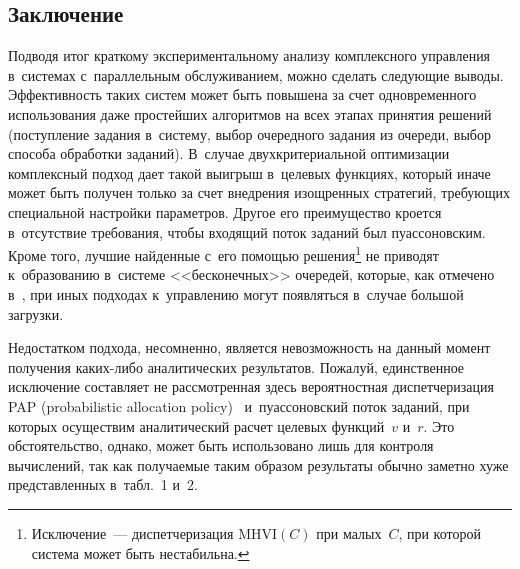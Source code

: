 \begin{multicols}{2}
\vspace*{-6pt}
   
\section{Заключение}

\vspace*{-6pt}

   Подводя итог краткому экспериментальному анализу комплексного 
управления в~системах с~параллельным обслуживанием, можно сделать 
следующие выводы. Эффективность таких систем может быть повышена за 
счет одновременного использования даже простейших алгоритмов на всех 
этапах принятия решений (поступление задания в~систему, выбор очередного 
задания из очереди, выбор способа обработки заданий). В~случае 
двухкритериальной оптимизации комплексный подход дает такой выигрыш 
в~целевых функциях, который иначе может быть получен только за счет 
внедрения изощренных стратегий, требующих специальной настройки 
параметров. Другое его преимущество кроется в~отсутствие требования, чтобы 
входящий поток заданий был пуассоновским. Кроме того, лучшие найденные 
с~его помощью решения\footnote[1]{Исключение~--- диспетчеризация $\mathrm{MHVI}(C)$ при 
малых~$C$, при которой система может быть нестабильна.} не приводят к~образованию 
в~системе <<бесконечных>> очередей, которые, как отмечено 
в~\cite[разд.~5]{4-kon}, при иных подходах к~управлению могут появляться 
в~случае большой загрузки. 
   
   Недостатком подхода, несомненно, является невозможность на данный 
момент получения ка\-ких-ли\-бо аналитических результатов. Пожалуй, 
единственное исключение составляет не рассмотренная здесь вероятностная 
диспетчеризация PAP (probabilistic allocation policy)~\cite[разд.~3]{8-kon} и~пуассоновский поток заданий, 
при которых осуществим аналитический расчет целевых функций~$v$ и~$r$. 
Это обстоятельство, однако, может  быть использовано лишь для контроля 
вы\-чис\-ле\-ний, так как  получаемые таким образом результаты обычно заметно 
хуже пред\-став\-лен\-ных в~табл.~1 и~2.

\vspace*{-6pt}
   
{\small\frenchspacing
 {\baselineskip=10.8pt
 \begin{thebibliography}{99}
 
 \vspace*{-6pt}
 

\end{thebibliography}}}
\end{multicols}
